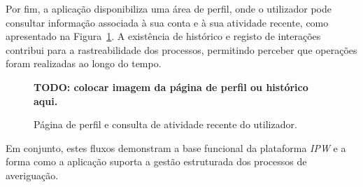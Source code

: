 Por fim, a aplica\c{c}\~{a}o disponibiliza uma \'{a}rea de perfil, onde o utilizador pode consultar informa\c{c}\~{a}o associada \`{a} sua conta e \`{a} sua atividade recente, como apresentado na Figura~\ref{fig:demo-perfil}. A exist\^{e}ncia de hist\'{o}rico e registo de intera\c{c}\~{o}es contribui para a rastreabilidade dos processos, permitindo perceber que opera\c{c}\~{o}es foram realizadas ao longo do tempo.

\begin{figure}[h]
    \centering
    \textbf{TODO: colocar imagem da p\'{a}gina de perfil ou hist\'{o}rico aqui.}
    \caption{P\'{a}gina de perfil e consulta de atividade recente do utilizador.}
    \label{fig:demo-perfil}
\end{figure}

Em conjunto, estes fluxos demonstram a base funcional da plataforma \textit{IPW} e a forma como a aplica\c{c}\~{a}o suporta a gest\~{a}o estruturada dos processos de averigua\c{c}\~{a}o.
